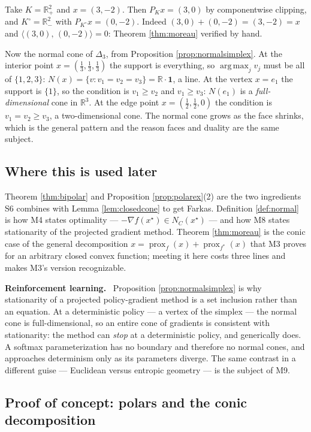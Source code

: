 \documentclass[11pt,a4paper]{article}
\newcommand{\mpart}[1]{\smallskip\noindent\textbf{#1}\ \ignorespaces}
\theoremstyle{definition}
\theoremstyle{plain}
\theoremstyle{remark}
\newcommand{\R}{\mathbb{R}}
\newcommand{\ip}[2]{\langle #1,\, #2\rangle}
\newcommand{\proj}{P}
\DeclareMathOperator{\prox}{prox}
\DeclareMathOperator*{\argmax}{arg\,max}
\newcommand{\Simplex}{\Delta}
\newcommand{\Nc}{N}
\newcommand{\one}{\mathbf{1}}
\begin{document}
Take $K=\R^2_+$ and $x=(3,-2)$. Then $\proj_Kx=(3,0)$ by componentwise clipping, and
$K^\circ=\R^2_-$ with $\proj_{K^\circ}x=(0,-2)$. Indeed $(3,0)+(0,-2)=(3,-2)=x$ and
$\ip{(3,0)}{(0,-2)}=0$: Theorem \ref{thm:moreau} verified by hand.

Now the normal cone of $\Simplex_3$, from Proposition \ref{prop:normalsimplex}. At the interior
point $x=(\tfrac13,\tfrac13,\tfrac13)$ the support is everything, so $\argmax_jv_j$ must be all
of $\{1,2,3\}$: $\Nc(x)=\{v:v_1=v_2=v_3\}=\R\cdot\one$, a line. At the vertex $x=e_1$ the
support is $\{1\}$, so the condition is $v_1\ge v_2$ and $v_1\ge v_3$: $\Nc(e_1)$ is a
\emph{full-dimensional} cone in $\R^3$. At the edge point $x=(\tfrac12,\tfrac12,0)$ the
condition is $v_1=v_2\ge v_3$, a two-dimensional cone. The normal cone grows as the face
shrinks, which is the general pattern and the reason faces and duality are the same subject.

\subsection*{Where this is used later}

Theorem \ref{thm:bipolar} and Proposition \ref{prop:polarex}(2) are the two ingredients S6
combines with Lemma \ref{lem:closedcone} to get Farkas. Definition \ref{def:normal} is how M4
states optimality --- $-\nabla f(x^\star)\in\Nc_C(x^\star)$ --- and how M8 states stationarity
of the projected gradient method. Theorem \ref{thm:moreau} is the conic case of the general
decomposition $x=\prox_f(x)+\prox_{f^*}(x)$ that M3 proves for an arbitrary closed convex
function; meeting it here costs three lines and makes M3's version recognizable.

\mpart{Reinforcement learning.} Proposition \ref{prop:normalsimplex} is why stationarity of a
projected policy-gradient method is a set inclusion rather than an equation. At a deterministic
policy --- a vertex of the simplex --- the normal cone is full-dimensional, so an entire cone of
gradients is consistent with stationarity: the method can \emph{stop} at a deterministic policy,
and generically does. A softmax parameterization has no boundary and therefore no normal cones,
and approaches determinism only as its parameters diverge. The same contrast in a different
guise --- Euclidean versus entropic geometry --- is the subject of M9.

\subsection*{Proof of concept: polars and the conic decomposition}
\end{document}
